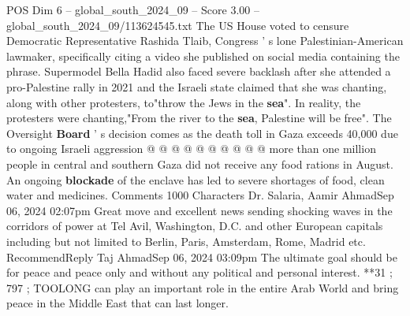 \begin{textsample}{POS Dim 6 – global\_south\_2024\_09 – Score 3.00 – global\_south\_2024\_09/113624545.txt}
The US House voted to censure Democratic Representative Rashida Tlaib, Congress ' s lone Palestinian-American lawmaker, specifically citing a video she published on social media containing the phrase.
Supermodel Bella Hadid also faced severe backlash after she attended a pro-Palestine rally in 2021 and the Israeli state claimed that she was chanting, along with other protesters, to"throw the Jews in the \textbf{sea}".
In reality, the protesters were chanting,"From the river to the \textbf{sea}, Palestine will be free".
The Oversight \textbf{Board} ' s decision comes as the death toll in Gaza exceeds 40,000 due to ongoing Israeli aggression @ @ @ @ @ @ @ @ @ @ more than one million people in central and southern Gaza did not receive any food rations in August.
An ongoing \textbf{blockade} of the enclave has led to severe shortages of food, clean water and medicines.
Comments 1000 Characters Dr.
Salaria, Aamir AhmadSep 06, 2024 02:07pm Great move and excellent news sending shocking waves in the corridors of power at Tel Avil, Washington, D.C. and other European capitals including but not limited to Berlin, Paris, Amsterdam, Rome, Madrid etc.
RecommendReply Taj AhmadSep 06, 2024 03:09pm The ultimate goal should be for peace and peace only and without any political and personal interest. **31 ; 797 ; TOOLONG can play an important role in the entire Arab World and bring peace in the Middle East that can last longer.

\end{textsample}
